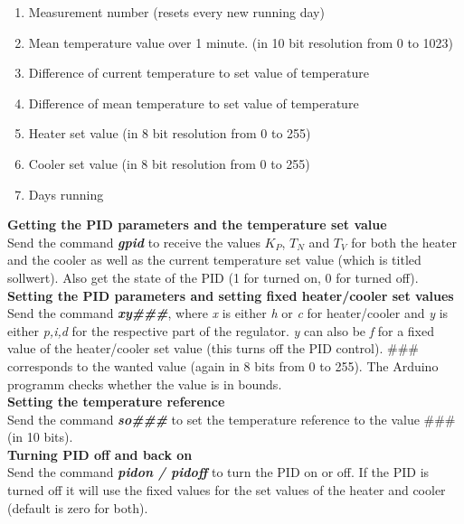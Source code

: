 \documentclass[12pt]{scrartcl}
\begin{document}
      \begin{enumerate}
        \item Measurement number (resets every new running day)
        \item Mean temperature value over 1 minute. (in 10 bit resolution from 0 to 1023)
        \item Difference of current temperature to set value of temperature
        \item Difference of mean temperature to set value of temperature
        \item Heater set value (in 8 bit resolution from 0 to 255)
        \item Cooler set value (in 8 bit resolution from 0 to 255)
        \item Days running
      \end{enumerate}\hspace{10pt}

      \noindent\textbf{Getting the PID parameters and the temperature set value} \\
      Send the command \textbf{\textit{gpid}} to receive the values $K_P$, $T_N$
      and $T_V$ for both the heater and the cooler as well as the current
      temperature set value (which is titled sollwert). Also get the state of
      the PID (1 for turned on, 0 for turned off).\\

      \noindent\textbf{Setting the PID parameters and setting fixed heater/cooler
      set values} \\
      Send the command \textbf{\textit{xy\#\#\#}}, where \textit{x} is either
      \textit{h} or \textit{c} for heater/cooler and \textit{y} is either
      \textit{p,i,d} for the respective part of the regulator. \textit{y} can
      also be \textit{f} for a fixed value of the heater/cooler set value (this
      turns off the PID control). \#\#\# corresponds to the wanted value (again in
      8 bits from 0 to 255). The Arduino programm checks whether the value is
      in bounds.\\

      \noindent\textbf{Setting the temperature reference}\\
      Send the command \textbf{\textit{so\#\#\#}} to set the temperature
      reference to the value \#\#\# (in 10 bits).\\

      \noindent\textbf{Turning PID off and back on}\\
      Send the command \textbf{\textit{pidon / pidoff}} to turn the PID on or off.
      If the PID is turned off it will use the fixed values for the set values of
      the heater and cooler (default is zero for both).\\
\end{document}
